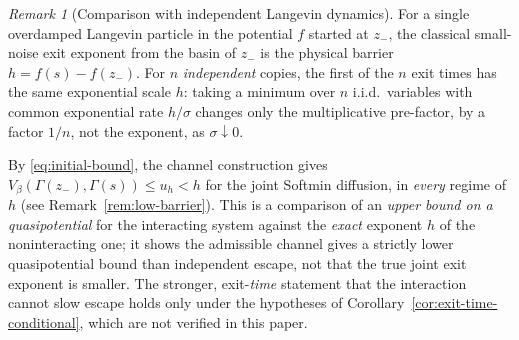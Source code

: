 \documentclass{article} %
\theoremstyle{plain}
\theoremstyle{definition}
\theoremstyle{remark}
\newtheorem{remark}[theorem]{Remark}
\begin{document}
\begin{remark}[Comparison with independent Langevin dynamics]
\label{rem:comparison-full}
For a single overdamped Langevin particle in the potential $f$ started at $z_-$, the classical small-noise exit exponent from the basin of $z_-$ is the physical barrier $h=f(s)-f(z_-)$. For $n$ \emph{independent} copies, the first of the $n$ exit times has the same exponential scale $h$: taking a minimum over $n$ i.i.d.\ variables with common exponential rate $h/\sigma$ changes only the multiplicative pre-factor, by a factor $1/n$, not the exponent, as $\sigma\downarrow0$.

By \eqref{eq:initial-bound}, the channel construction gives $V_\beta(\Gamma(z_-),\Gamma(s))\le u_h<h$ for the joint Softmin diffusion, in \emph{every} regime of $h$ (see Remark~\ref{rem:low-barrier}). This is a comparison of an \emph{upper bound on a quasipotential} for the interacting system against the \emph{exact} exponent $h$ of the noninteracting one; it shows the admissible channel gives a strictly lower quasipotential bound than independent escape, not that the true joint exit exponent is smaller. The stronger, exit-\emph{time} statement that the interaction cannot slow escape holds only under the hypotheses of Corollary~\ref{cor:exit-time-conditional}, which are not verified in this paper.
\end{remark}
\end{document}
